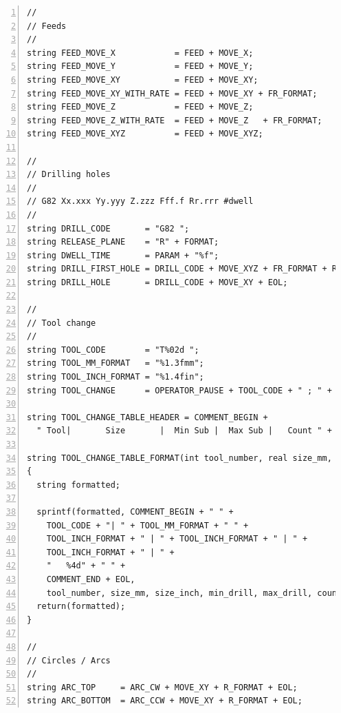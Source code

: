 \documentclass[11pt]{book}
\begin{document}
\begin{lstlisting}[numbers=left,
	breaklines=true,	
	numberstyle=\tiny\color{gray},
	basicstyle=\ttfamily\tiny
]
//
// Feeds
//
string FEED_MOVE_X            = FEED + MOVE_X;
string FEED_MOVE_Y            = FEED + MOVE_Y;
string FEED_MOVE_XY           = FEED + MOVE_XY;
string FEED_MOVE_XY_WITH_RATE = FEED + MOVE_XY + FR_FORMAT;
string FEED_MOVE_Z            = FEED + MOVE_Z;
string FEED_MOVE_Z_WITH_RATE  = FEED + MOVE_Z   + FR_FORMAT;
string FEED_MOVE_XYZ          = FEED + MOVE_XYZ;

//
// Drilling holes
//
// G82 Xx.xxx Yy.yyy Z.zzz Fff.f Rr.rrr #dwell
//
string DRILL_CODE       = "G82 ";
string RELEASE_PLANE    = "R" + FORMAT;
string DWELL_TIME       = PARAM + "%f";
string DRILL_FIRST_HOLE = DRILL_CODE + MOVE_XYZ + FR_FORMAT + RELEASE_PLANE + DWELL_TIME + EOL;
string DRILL_HOLE       = DRILL_CODE + MOVE_XY + EOL;

//
// Tool change
//
string TOOL_CODE        = "T%02d ";
string TOOL_MM_FORMAT   = "%1.3fmm";
string TOOL_INCH_FORMAT = "%1.4fin";
string TOOL_CHANGE      = OPERATOR_PAUSE + TOOL_CODE + " ; " + FORMAT + EOL;

string TOOL_CHANGE_TABLE_HEADER = COMMENT_BEGIN + 
  " Tool|       Size       |  Min Sub |  Max Sub |   Count " + COMMENT_END + EOL;

string TOOL_CHANGE_TABLE_FORMAT(int tool_number, real size_mm, real size_inch, real min_drill, real max_drill, int count)
{
  string formatted;
  
  sprintf(formatted, COMMENT_BEGIN + " " + 
    TOOL_CODE + "| " + TOOL_MM_FORMAT + " " +
    TOOL_INCH_FORMAT + " | " + TOOL_INCH_FORMAT + " | " +
    TOOL_INCH_FORMAT + " | " + 
    "   %4d" + " " + 
    COMMENT_END + EOL,
    tool_number, size_mm, size_inch, min_drill, max_drill, count);
  return(formatted);
}

//
// Circles / Arcs
//
string ARC_TOP     = ARC_CW + MOVE_XY + R_FORMAT + EOL;
string ARC_BOTTOM  = ARC_CCW + MOVE_XY + R_FORMAT + EOL;

\end{lstlisting}


\backmatter

\printindex
\end{document}
